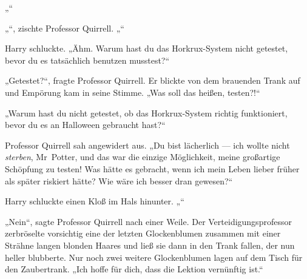 „“

„“, zischte Professor Quirrell. „“

Harry schluckte.
„Ähm. Warum hast du das Horkrux-System nicht getestet, bevor du es tatsächlich benutzen musstest?“

„Getestet?“, fragte Professor Quirrell.
Er blickte von dem brauenden Trank auf und Empörung kam in seine Stimme.
„Was soll das heißen, testen?!“

„Warum hast du nicht getestet, ob das Horkrux-System richtig funktioniert, bevor du es an Halloween gebraucht hast?“

Professor Quirrell sah angewidert aus.
„Du bist lächerlich — ich wollte nicht \emph{sterben}, Mr~Potter, und das war die einzige Möglichkeit, meine großartige Schöpfung zu testen! Was hätte es gebracht, wenn ich mein Leben lieber früher als später riskiert hätte? Wie wäre ich besser dran gewesen?“

Harry schluckte einen Kloß im Hals hinunter.
„“

„Nein“, sagte Professor Quirrell nach einer Weile.
Der Verteidigungsprofessor zerbröselte vorsichtig eine der letzten Glockenblumen zusammen mit einer Strähne langen blonden Haares und ließ sie dann in den Trank fallen, der nun heller blubberte. Nur noch zwei weitere Glockenblumen lagen auf dem Tisch für den Zaubertrank.
„Ich hoffe für dich, dass die Lektion vernünftig ist.“

